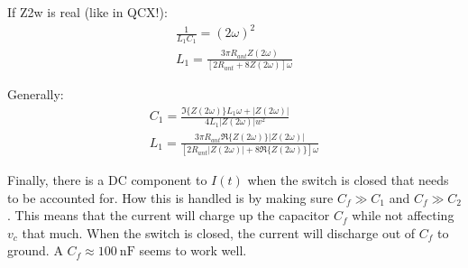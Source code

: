 \documentclass[10pt,letterpaper]{article}
\begin{document}
\begin{enumerate}
If Z2w is real (like in QCX!):
\begin{align*}
\frac{1}{L_1C_1}=(2\omega)^2\\
L_1=\frac{3 \pi R_{ant} Z(2\omega) }{[2R_{ant}+8Z(2\omega)]\omega}
\end{align*}

Generally:
\begin{align*}
C_1 = \frac{\Im\{Z(2\omega)\}L_1\omega+|Z(2\omega)|}{4L_1 |Z(2\omega)|w^2}\\
L_1=\frac{3 \pi R_{ant} \Re\{Z(2\omega)\} |Z(2\omega)| }{[2R_{ant}|Z(2\omega)|+8\Re\{Z(2\omega)\}]\omega}
\end{align*}


Finally, there is a DC component to $I(t)$ when the switch is closed that needs to be accounted for. How this is handled is by making sure $C_f \gg C_1$ and $C_f \gg C_2$. This means that the current will charge up the capacitor $C_f$ while not affecting $v_c$ that much. When the switch is closed, the current will discharge out of $C_f$ to ground. A $C_f\approx \SI{100}{\nano\farad}$ seems to work well.



\end{enumerate}
\end{document}

